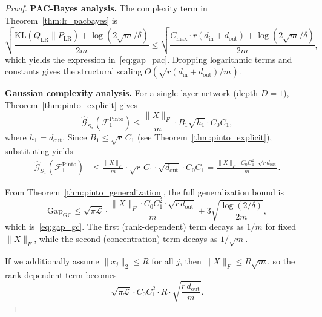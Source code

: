 \documentclass{article}
\theoremstyle{plain}
\theoremstyle{definition}
\theoremstyle{remark}
\begin{document}
\begin{proof}
\textbf{PAC-Bayes analysis.}
The complexity term in Theorem~\ref{thm:lr_pacbayes} is
\[
\sqrt{\frac{\mathrm{KL}(Q_{\text{LR}} \| P_{\text{LR}}) + \log(2\sqrt{m}/\delta)}{2m}}
\le
\sqrt{\frac{C_{\max} \cdot r(d_{\text{in}} + d_{\text{out}}) + \log(2\sqrt{m}/\delta)}{2m}},
\]
which yields the expression in~\eqref{eq:gap_pac}. Dropping logarithmic terms and constants gives the structural scaling $O(\sqrt{r(d_{\text{in}} + d_{\text{out}})/m})$.

\textbf{Gaussian complexity analysis.}
For a single-layer network (depth $D=1$), Theorem~\ref{thm:pinto_explicit} gives
\[
\hat{\mathcal{G}}_{S_x}(\mathcal{F}^{\text{Pinto}}_1)
\le \frac{\|X\|_F}{m} \cdot B_1 \sqrt{h_1} \cdot C_0 C_1,
\]
where $h_1 = d_{\text{out}}$. Since $B_1 \le \sqrt{r}\,C_1$ (see Theorem~\ref{thm:pinto_explicit}), substituting yields
\begin{align*}
\hat{\mathcal{G}}_{S_x}(\mathcal{F}^{\text{Pinto}}_1)
&\le \frac{\|X\|_F}{m} \cdot \sqrt{r}\, C_1 \cdot \sqrt{d_{\text{out}}} \cdot C_0 C_1
= \frac{\|X\|_F \cdot C_0 C_1^2 \cdot \sqrt{r\, d_{\text{out}}}}{m}.
\end{align*}

From Theorem~\ref{thm:pinto_generalization}, the full generalization bound is
\[
\text{Gap}_{\text{GC}}
\le
\sqrt{\pi\mathcal{L}} \cdot \frac{\|X\|_F \cdot C_0 C_1^2 \cdot \sqrt{r\, d_{\text{out}}}}{m}
+
3\sqrt{\frac{\log(2/\delta)}{2m}},
\]
which is~\eqref{eq:gap_gc}. The first (rank-dependent) term decays as $1/m$ for fixed $\|X\|_F$, while the second (concentration) term decays as $1/\sqrt{m}$.

If we additionally assume $\|x_j\|_2 \le R$ for all $j$, then $\|X\|_F \le R\sqrt{m}$, so the rank-dependent term becomes
\[
\sqrt{\pi\mathcal{L}} \cdot C_0 C_1^2 \cdot R \cdot \sqrt{\frac{r\, d_{\text{out}}}{m}}.
\]
\end{proof}
\end{document}
